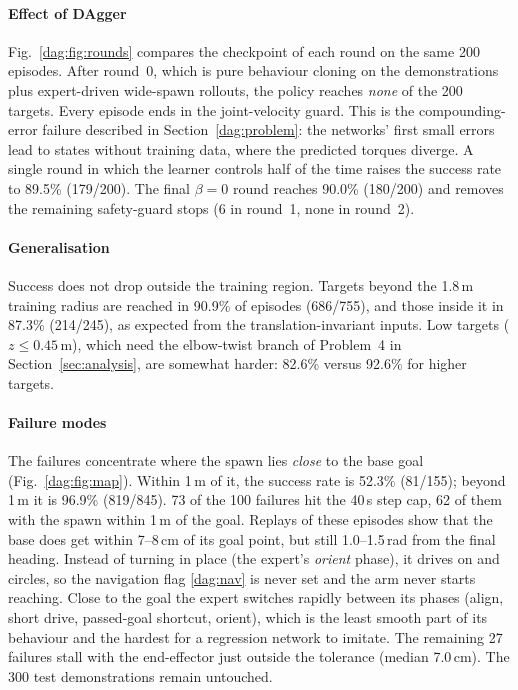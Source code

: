 \documentclass[conference]{IEEEtran}
\begin{document}
\paragraph{Effect of DAgger} Fig.~\ref{dag:fig:rounds} compares the checkpoint of each round on the same 200 episodes. After round~0, which is pure behaviour cloning on the demonstrations plus expert-driven wide-spawn rollouts, the policy reaches \emph{none} of the 200 targets. Every episode ends in the joint-velocity guard. This is the compounding-error failure described in Section~\ref{dag:problem}: the networks' first small errors lead to states without training data, where the predicted torques diverge. A single round in which the learner controls half of the time raises the success rate to 89.5\% (179/200). The final $\beta=0$ round reaches 90.0\% (180/200) and removes the remaining safety-guard stops (6 in round~1, none in round~2).

\paragraph{Generalisation} Success does not drop outside the training region. Targets beyond the 1.8\,m training radius are reached in 90.9\% of episodes (686/755), and those inside it in 87.3\% (214/245), as expected from the translation-invariant inputs. Low targets ($z\le0.45$\,m), which need the elbow-twist branch of Problem~4 in Section~\ref{sec:analysis}, are somewhat harder: 82.6\% versus 92.6\% for higher targets.

\paragraph{Failure modes} The failures concentrate where the spawn lies \emph{close} to the base goal (Fig.~\ref{dag:fig:map}). Within 1\,m of it, the success rate is 52.3\% (81/155); beyond 1\,m it is 96.9\% (819/845). 73 of the 100 failures hit the 40\,s step cap, 62 of them with the spawn within 1\,m of the goal. Replays of these episodes show that the base does get within 7--8\,cm of its goal point, but still 1.0--1.5\,rad from the final heading. Instead of turning in place (the expert's \emph{orient} phase), it drives on and circles, so the navigation flag \eqref{dag:nav} is never set and the arm never starts reaching. Close to the goal the expert switches rapidly between its phases (align, short drive, passed-goal shortcut, orient), which is the least smooth part of its behaviour and the hardest for a regression network to imitate. The remaining 27 failures stall with the end-effector just outside the tolerance (median 7.0\,cm). The 300 test demonstrations remain untouched.
\end{document}
